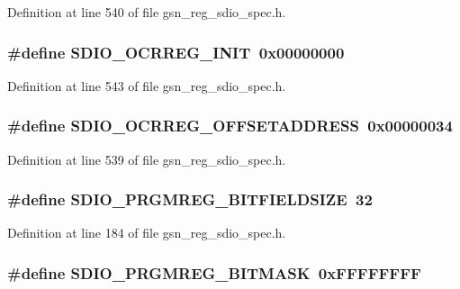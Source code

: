 Definition at line 540 of file gsn\_\-reg\_\-sdio\_\-spec.h.

\hypertarget{a00571_ae4bf4feaeefa4683a606622e68b93101}{
\subsubsection[{SDIO\_\-OCRREG\_\-INIT}]{\setlength{\rightskip}{0pt plus 5cm}\#define SDIO\_\-OCRREG\_\-INIT~0x00000000}}
\label{a00571_ae4bf4feaeefa4683a606622e68b93101}


Definition at line 543 of file gsn\_\-reg\_\-sdio\_\-spec.h.

\hypertarget{a00571_a818124b14083677b8d618686288da9bb}{
\subsubsection[{SDIO\_\-OCRREG\_\-OFFSETADDRESS}]{\setlength{\rightskip}{0pt plus 5cm}\#define SDIO\_\-OCRREG\_\-OFFSETADDRESS~0x00000034}}
\label{a00571_a818124b14083677b8d618686288da9bb}


Definition at line 539 of file gsn\_\-reg\_\-sdio\_\-spec.h.

\hypertarget{a00571_ab0e381cd32fb631ea174d30b188cac78}{
\subsubsection[{SDIO\_\-PRGMREG\_\-BITFIELDSIZE}]{\setlength{\rightskip}{0pt plus 5cm}\#define SDIO\_\-PRGMREG\_\-BITFIELDSIZE~32}}
\label{a00571_ab0e381cd32fb631ea174d30b188cac78}


Definition at line 184 of file gsn\_\-reg\_\-sdio\_\-spec.h.

\hypertarget{a00571_a8eb6f791d4b3e507355b3e5a467003bc}{
\subsubsection[{SDIO\_\-PRGMREG\_\-BITMASK}]{\setlength{\rightskip}{0pt plus 5cm}\#define SDIO\_\-PRGMREG\_\-BITMASK~0xFFFFFFFF}}
\label{a00571_a8eb6f791d4b3e507355b3e5a467003bc}


